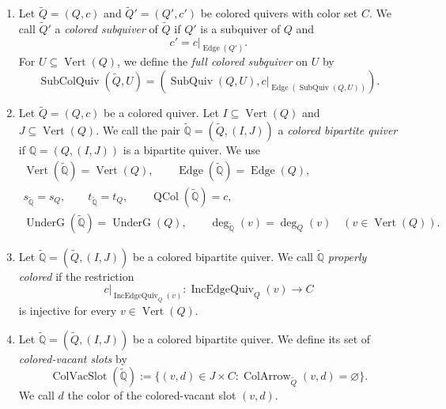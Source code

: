 \begin{definition}
\begin{enumerate}[font=\itshape]
A \textit{color-preserving homomorphism} $\widetilde Q\to\widetilde Q'$
is a quiver homomorphism $(\phi_0,\phi_1):Q\to Q'$ such that
\[
 \operatorname{QCol}(\widetilde Q')\circ\phi_1
 =\operatorname{QCol}(\widetilde Q).
\]
We call this homomorphism a \textit{color-preserving isomorphism}
if $\phi_0$ and $\phi_1$ are bijective.
\item Let $\widetilde Q=(Q,c)$ and $\widetilde Q'=(Q',c')$ be colored quivers with color set $C$.
We call $\widetilde Q'$ a \textit{colored subquiver} of $\widetilde Q$ if $Q'$ is a subquiver of $Q$ and
\[
 c'=c\big|_{\operatorname{Edge}(Q')}.
\]
For $U\subseteq\operatorname{Vert}(Q)$, we define the \textit{full colored subquiver} on $U$ by
\[
 \operatorname{SubColQuiv}(\widetilde Q,U)=\left(\operatorname{SubQuiv}(Q,U),c\big|_{\operatorname{Edge}(\operatorname{SubQuiv}(Q,U))}\right).
\]
\item Let $\widetilde Q=(Q,c)$ be a colored quiver. Let $I\subseteq\operatorname{Vert}(Q)$ and $J\subseteq\operatorname{Vert}(Q)$.
We call the pair $\widetilde{\mathbb Q}=(\widetilde Q,(I,J))$ a \textit{colored bipartite quiver} if $\mathbb Q=(Q,(I,J))$ is a bipartite quiver.
We use
\[
\begin{gathered}
 \operatorname{Vert}(\widetilde{\mathbb Q})=\operatorname{Vert}(Q),\qquad
 \operatorname{Edge}(\widetilde{\mathbb Q})=\operatorname{Edge}(Q),\\
 s_{\widetilde{\mathbb Q}}=s_Q,\qquad t_{\widetilde{\mathbb Q}}=t_Q,\qquad
 \operatorname{QCol}(\widetilde{\mathbb Q})=c,\\
 \operatorname{UnderG}(\widetilde{\mathbb Q})=\operatorname{UnderG}(Q),\qquad
 \deg_{\widetilde{\mathbb Q}}(v)=\deg_Q(v)\quad(v\in\operatorname{Vert}(Q)).
\end{gathered}
\]
\item Let $\widetilde{\mathbb Q}=(\widetilde Q,(I,J))$ be a colored bipartite quiver.
We call $\widetilde{\mathbb Q}$ \textit{properly colored} if the restriction
\[
 c\big|_{\operatorname{IncEdgeQuiv}_Q(v)}:\operatorname{IncEdgeQuiv}_Q(v)\longrightarrow C
\]
is injective for every $v\in\operatorname{Vert}(Q)$.
\item\label{d:vacant-slot} Let $\widetilde{\mathbb Q}=(\widetilde Q,(I,J))$ be a colored bipartite quiver.
We define its set of \textit{colored-vacant slots} by
\[
 \operatorname{ColVacSlot}(\widetilde{\mathbb Q})
 :=\{(v,d)\in J\times C:
 \operatorname{ColArrow}_{\widetilde Q}(v,d)=\varnothing\}.
\]
We call $d$ the color of the colored-vacant slot $(v,d)$.
\end{enumerate}
\end{definition}

